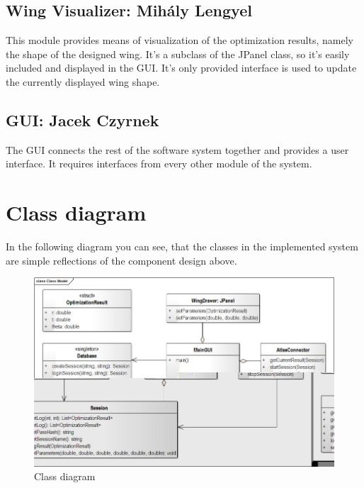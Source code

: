 \documentclass[10pt,a4paper]{report}
\begin{document}
\subsection{Wing Visualizer: Mihály Lengyel}
This module provides means of visualization of the optimization results, namely the shape of the designed wing. It's a subclass of the JPanel class, so it's easily included and displayed in the GUI. It's only provided interface is used to update the currently displayed wing shape.

\subsection{GUI: Jacek Czyrnek}
The GUI connects the rest of the software system together and provides a user interface. It requires interfaces from every other module of the system.
\pagebreak

\section{Class diagram}
In the following diagram you can see, that the classes in the implemented system are simple reflections of the component design above.\\
\begin{figure}[h!]
\includegraphics[width=\textwidth]{ClassModel.jpg}
\caption{Class diagram}
\end{figure}
\pagebreak
\end{document}

